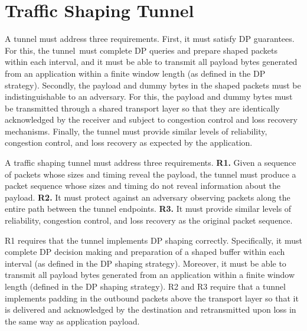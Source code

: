 \section{Traffic Shaping Tunnel}
\label{sec:design}

%
A tunnel must address three requirements.
First, it must satisfy DP guarantees. For this, the tunnel~must complete DP
queries and prepare shaped packets within each interval, and it
must be able to transmit all payload bytes generated from an application within
a finite window length (as defined in the DP strategy).
%
Secondly, the payload and dummy bytes in the shaped packets must be
indistinguishable to an adversary. For this, the payload and dummy bytes must be
transmitted through a shared transport layer so that they are identically
acknowledged by the receiver and subject to congestion control and
loss recovery mechanisms.
%
Finally, the tunnel must provide similar levels of reliability,
congestion control, and loss recovery as expected by the application.

A traffic shaping tunnel must address three requirements.
{\bf R1.} Given a sequence of packets whose sizes and timing reveal the payload,
the tunnel must produce a packet sequence whose sizes and timing do not reveal
information about the payload.
{\bf R2.} It must protect against an adversary observing packets
along the entire path between the tunnel endpoints.
{\bf R3.} It must provide similar levels of reliability, congestion control, and
loss recovery as the original packet sequence.

R1 requires that the tunnel implements DP shaping correctly. Specifically,
it must complete DP decision making and preparation of a shaped buffer within
each interval (as defined in the DP shaping strategy). Moreover, it must be able
to transmit all payload bytes generated from an application within a finite
window length (defined in the DP shaping strategy).
R2 and R3 require that a tunnel implements padding in the outbound packets above
the transport layer so that it is delivered and acknowledged by the destination
and retransmitted upon loss in the same way as application payload.

